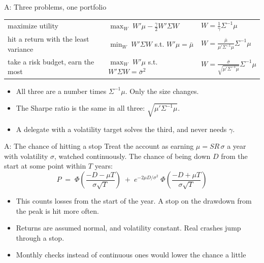 \documentclass[aspectratio=169,10pt]{beamer}
\begin{document}
\begin{frame}[label=appendix_equiv]{A: Three problems, one portfolio}
\renewcommand{\arraystretch}{1.7}
\begin{center}
\begin{tabular}{lll}
\toprule
maximize utility & $\max_{W}\; W'\mu - \frac{\gamma}{2}W'\Sigma W$ & $W = \frac{1}{\gamma}\Sigma^{-1}\mu$ \\
hit a return with the least variance & $\min_{W}\; W'\Sigma W$ s.t. $W'\mu = \bar\mu$ & $W = \frac{\bar\mu}{\mu'\Sigma^{-1}\mu}\Sigma^{-1}\mu$ \\
take a risk budget, earn the most & $\max_{W}\; W'\mu$ s.t. $W'\Sigma W = \bar\sigma^{2}$ & $W = \frac{\bar\sigma}{\sqrt{\mu'\Sigma^{-1}\mu}}\Sigma^{-1}\mu$ \\
\bottomrule
\end{tabular}
\end{center}
\vskip 10pt
\begin{itemize}
\item All three are a number times $\Sigma^{-1}\mu$. Only the size changes.
\vskip 6pt
\item The Sharpe ratio is the same in all three: $\sqrt{\mu'\Sigma^{-1}\mu}$.
\vskip 6pt
\item A delegate with a volatility target solves the third, and never needs $\gamma$.
\end{itemize}
\hfill \hyperlink{appendix_equiv_back}{}
\end{frame}

\begin{frame}[label=appendix_stop]{A: The chance of hitting a stop}
Treat the account as earning $\mu = SR\,\sigma$ a year with volatility $\sigma$, watched continuously. The chance of being down $D$ from the start at some point within $T$ years:
\[ P \;=\; \Phi\!\left(\frac{-D-\mu T}{\sigma\sqrt{T}}\right) \;+\; e^{-2\mu D/\sigma^{2}}\;\Phi\!\left(\frac{-D+\mu T}{\sigma\sqrt{T}}\right) \]
\vskip 6pt
\begin{itemize}
\item This counts losses from the start of the year. A stop on the drawdown from the peak is hit more often.
\vskip 6pt
\item Returns are assumed normal, and volatility constant. Real crashes jump through a stop.
\vskip 6pt
\item Monthly checks instead of continuous ones would lower the chance a little
\end{itemize}
\hfill \hyperlink{back_stop}{}
\end{frame}
\end{document}
